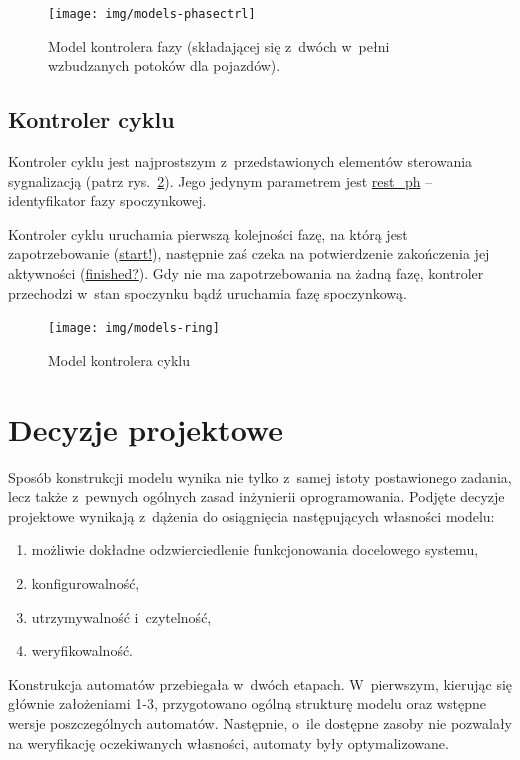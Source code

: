 \documentclass{pracamgr}
\newcommand{\imgr}[1]{rys.~\ref{#1}}
\theoremstyle{plain}
\begin{document}
\begin{figure}
  \centering
  \vspace*{-2.5cm}
  \texttt{[image: img/models-phasectrl]}
  \caption{Model kontrolera fazy (składającej się z~dwóch w~pełni wzbudzanych potoków dla pojazdów).}
  \label{img:phase-ctrl}
\end{figure}

\subsection{Kontroler cyklu}
\label{ss:models:models:ring}
Kontroler cyklu jest najprostszym z~przedstawionych elementów
sterowania sygnalizacją (patrz \imgr{img:ring-ctrl}). Jego jedynym
parametrem jest \url{rest_ph} -- identyfikator fazy spoczynkowej.

Kontroler cyklu uruchamia pierwszą kolejności fazę, na którą
jest zapotrzebowanie (\url{start!}), następnie zaś czeka na
potwierdzenie zakończenia jej aktywności (\url{finished?}). Gdy nie ma
zapotrzebowania na żadną fazę, kontroler przechodzi w~stan spoczynku
bądź uruchamia fazę spoczynkową.

\begin{figure}
  \centering
  \texttt{[image: img/models-ring]}
  \caption{Model kontrolera cyklu}
  \label{img:ring-ctrl}
\end{figure}

\section{Decyzje projektowe}
\label{s:models:project}

Sposób konstrukcji modelu wynika nie tylko z~samej istoty postawionego
zadania, lecz także z~pewnych ogólnych zasad inżynierii
oprogramowania. Podjęte decyzje projektowe wynikają z~dążenia do
osiągnięcia następujących własności modelu:
\begin{enumerate}
  \item możliwie dokładne odzwierciedlenie funkcjonowania docelowego systemu,
  \item konfigurowalność,
  \item utrzymywalność i~czytelność,
  \item weryfikowalność.
\end{enumerate}
Konstrukcja automatów przebiegała w~dwóch etapach. W~pierwszym,
kierując się głównie założeniami 1-3, przygotowano ogólną strukturę
modelu oraz wstępne wersje poszczególnych automatów. Następnie, o~ile
dostępne zasoby nie pozwalały na weryfikację oczekiwanych własności,
automaty były optymalizowane.
\end{document}
